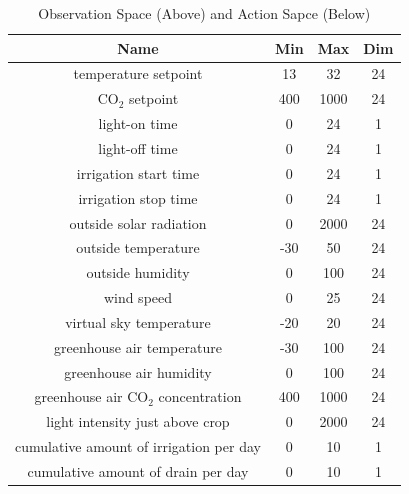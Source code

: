 \begin{table}
\centering
\caption{Observation Space (Above) and Action Sapce (Below)}
\label{tab:obs-sapce}
\begin{tabular}{cccc}
\toprule[1pt]
\textbf{Name}                                     & \textbf{Min} & \textbf{Max} & \textbf{Dim} \\
\midrule[1pt]
temperature setpoint                              & 13           & 32           & 24           \\
CO$_2$ setpoint                                   & 400          & 1000         & 24           \\
light-on time                                     & 0            & 24           & 1            \\
light-off time                                    & 0            & 24           & 1            \\
irrigation start time                             & 0            & 24           & 1            \\
irrigation stop time                              & 0            & 24           & 1            \\
outside solar radiation                           & 0            & 2000         & 24           \\
outside temperature                               & -30          & 50           & 24           \\
outside humidity                                  & 0            & 100          & 24           \\
wind speed                                        & 0            & 25           & 24           \\
virtual sky temperature                           & -20          & 20           & 24           \\
greenhouse air temperature                        & -30          & 100          & 24           \\
greenhouse air humidity                            & 0            & 100          & 24           \\
greenhouse air CO$_2$ concentration               & 400          & 1000         & 24           \\
light intensity just above crop                   & 0            & 2000         & 24           \\
cumulative amount of irrigation per day           & 0            & 10           & 1            \\
cumulative amount of drain per day                & 0            & 10           & 1            \\

\end{tabular}
\end{table}
